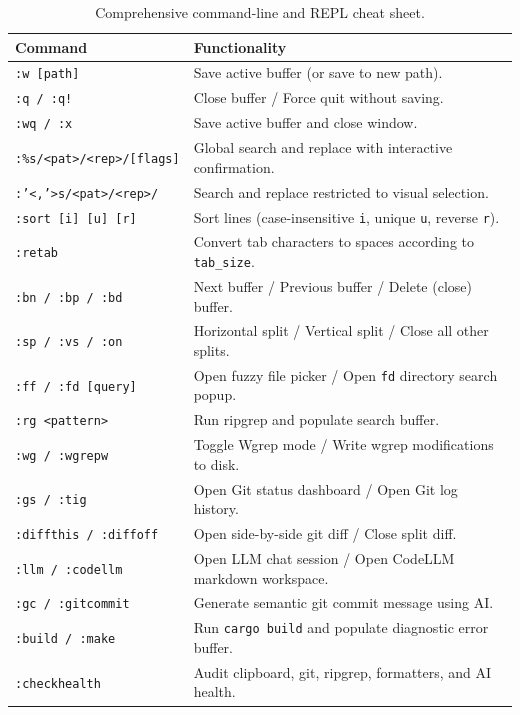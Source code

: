 \documentclass[11pt,a4paper,openany]{book}
\newcommand{\code}[1]{\colorbox{inlinebg}{\texttt{#1}}}
\begin{document}
\begin{table}[htbp]
\centering
\small
\begin{tabularx}{\textwidth}{l X}
\toprule
\textbf{Command} & \textbf{Functionality} \\
\midrule
\code{:w [path]} & Save active buffer (or save to new path). \\
\code{:q / :q!} & Close buffer / Force quit without saving. \\
\code{:wq / :x} & Save active buffer and close window. \\
\code{:\%s/<pat>/<rep>/[flags]} & Global search and replace with interactive confirmation. \\
\code{:'<,'>s/<pat>/<rep>/} & Search and replace restricted to visual selection. \\
\code{:sort [i] [u] [r]} & Sort lines (case-insensitive \code{i}, unique \code{u}, reverse \code{r}). \\
\code{:retab} & Convert tab characters to spaces according to \code{tab\_size}. \\
\code{:bn / :bp / :bd} & Next buffer / Previous buffer / Delete (close) buffer. \\
\code{:sp / :vs / :on} & Horizontal split / Vertical split / Close all other splits. \\
\code{:ff / :fd [query]} & Open fuzzy file picker / Open \texttt{fd} directory search popup. \\
\code{:rg <pattern>} & Run ripgrep and populate search buffer. \\
\code{:wg / :wgrepw} & Toggle Wgrep mode / Write wgrep modifications to disk. \\
\code{:gs / :tig} & Open Git status dashboard / Open Git log history. \\
\code{:diffthis / :diffoff} & Open side-by-side git diff / Close split diff. \\
\code{:llm / :codellm} & Open LLM chat session / Open CodeLLM markdown workspace. \\
\code{:gc / :gitcommit} & Generate semantic git commit message using AI. \\
\code{:build / :make} & Run \texttt{cargo build} and populate diagnostic error buffer. \\
\code{:checkhealth} & Audit clipboard, git, ripgrep, formatters, and AI health. \\
\bottomrule
\end{tabularx}
\caption{Comprehensive command-line and REPL cheat sheet.}
\end{table}
\end{document}
